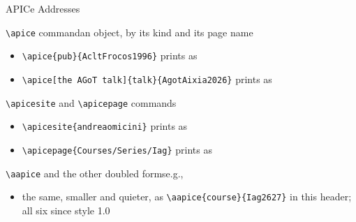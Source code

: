 \documentclass[presentation,cesena,apice]{beamer}\mode<presentation>{\usetheme{AMSCesena}}
\begin{document}
\begin{frame}[c,fragile]{APICe Addresses}
%
\begin{block}{\texttt{\textbackslash{}apice} command\textemdash{}an object, by its kind and its page name}
\begin{itemize}
	\item[e.g.] \verb|| prints as \apice{pub}{AcltFrocos1996}
	\item[e.g.] \verb|| prints as \apice[the AGoT talk]{talk}{AgotAixia2026}
\end{itemize}
\end{block}
%
\begin{block}{\texttt{\textbackslash{}apicesite} and \texttt{\textbackslash{}apicepage} commands}
\begin{itemize}
	\item[e.g.] \verb|| prints as \apicesite{andreaomicini}
	\item[e.g.] \verb|| prints as \apicepage{Courses/Series/Iag}
\end{itemize}
\end{block}
%
\begin{block}{\texttt{\textbackslash{}aapice} and the other doubled forms\textemdash{}e.g., }
\begin{itemize}
	\item the same, smaller and quieter, as \verb|\aapice{course}{Iag2627}| in this header; all six since style 1.0
\end{itemize}
\end{block}
%
\end{frame}
\end{document}
